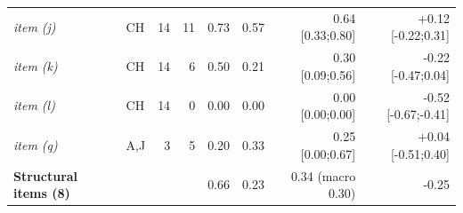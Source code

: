 \begin{table}[t]
\begin{tabular}{@{}llrrrrrr@{}}
\emph{item (j)} & CH & 14 & 11 & 0.73 & 0.57 & 0.64 [0.33;0.80] & +0.12 [-0.22;0.31] \\
\emph{item (k)} & CH & 14 & 6 & 0.50 & 0.21 & 0.30 [0.09;0.56] & -0.22 [-0.47;0.04] \\
\emph{item (l)} & CH & 14 & 0 & 0.00 & 0.00 & 0.00 [0.00;0.00] & -0.52 [-0.67;-0.41] \\
\emph{item (q)} & A,J & 3 & 5 & 0.20 & 0.33 & 0.25 [0.00;0.67] & +0.04 [-0.51;0.40] \\
\midrule
\textbf{Structural items (8)} & & & & 0.66 & 0.23 & 0.34 (macro 0.30) & -0.25 \\
\bottomrule
\end{tabular}
\end{table}
